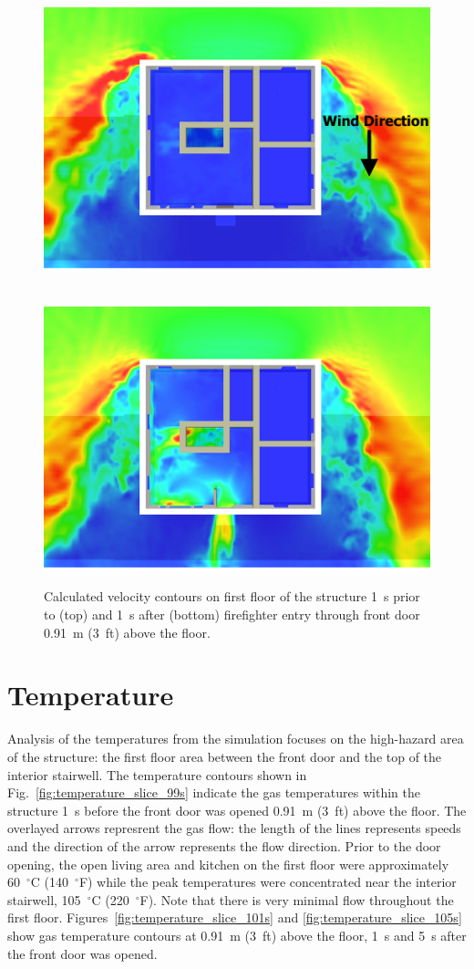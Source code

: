 \documentclass[12pt,oneside]{book}
\begin{document}
\begin{figure}[!ht]
\includegraphics[trim = 0in 1in 0in 1in, clip=true, width=.65\textwidth]{../Figures/velocity_slice_99s}

 \\
\includegraphics[trim = 0in 1in 0in 1in, clip=true, width=.65\textwidth]{../Figures/velocity_slice_101s}


\caption[Calculated velocity on first floor 1~s before and after front door opens]
{Calculated velocity contours on first floor of the structure 1~s prior to (top) and 1~s after (bottom) firefighter entry through front door 0.91~m (3~ft) above the floor.}
\label{fig:velocity_slices}
\end{figure}

\clearpage

\section{Temperature}
\label{temp}

Analysis of the temperatures from the simulation focuses on the high-hazard area of the structure: the first floor area between the front door and the top of the interior stairwell. The temperature contours shown in Fig.~\ref{fig:temperature_slice_99s} indicate the gas temperatures within the structure 1~s before the front door was opened 0.91~m (3~ft) above the floor. The overlayed arrows represrent the gas flow: the length of the lines represents speeds and the direction of the arrow represents the flow direction. Prior to the door opening, the open living area and kitchen on the first floor were approximately 60~$^{\circ}$C (140~$^{\circ}$F) while the peak temperatures were concentrated near the interior stairwell, 105~$^{\circ}$C (220~$^{\circ}$F). Note that there is very minimal flow throughout the first floor. Figures~\ref{fig:temperature_slice_101s} and \ref{fig:temperature_slice_105s} show gas temperature contours at 0.91~m (3~ft) above the floor, 1~s and 5~s after the front door was opened.
\end{document}
